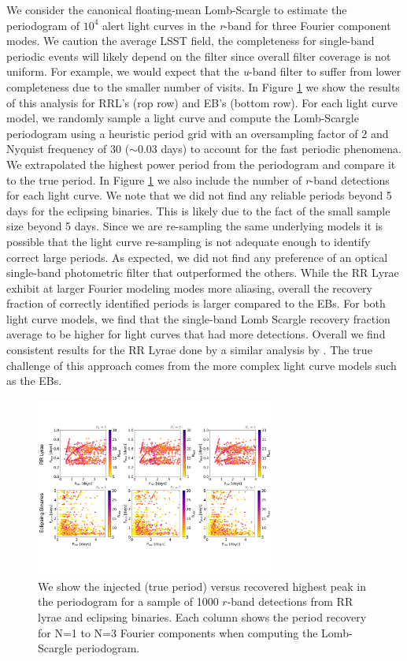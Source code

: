 \documentclass[DM,authoryear,toc]{lsstdoc}
\begin{document}
We consider the canonical floating-mean Lomb-Scargle to estimate the periodogram of $10^4$ alert light curves in the \textit{r}-band for three Fourier component modes. We caution the average LSST field, the completeness for single-band periodic events will likely depend on the filter since overall filter coverage is not uniform. For example, we would expect that the \textit{u}-band filter to suffer from lower completeness due to the smaller number of visits. In Figure \ref{fig:single_band_lsp} we show the results of this analysis for RRL's (rop row) and EB's (bottom row). For each light curve model, we randomly sample a light curve and compute the Lomb-Scargle periodogram using a heuristic period grid with an oversampling factor of 2 and Nyquist frequency of 30 ($\sim$0.03 days) to account for the fast periodic phenomena. We extrapolated the highest power period from the periodogram and compare it to the true period. In Figure \ref{fig:single_band_lsp} we also include the number of \textit{r}-band detections for each light curve. We note that we did not find any reliable periods beyond 5 days for the eclipsing binaries. This is likely due to the fact of the small sample size beyond 5 days. Since we are re-sampling the same underlying models it is possible that the light curve re-sampling is not adequate enough to identify correct large periods. As expected, we did not find any preference of an optical single-band photometric filter that outperformed the others. While the RR Lyrae exhibit at larger Fourier modeling modes more aliasing, overall the recovery fraction of correctly identified periods is larger compared to the EBs. For both light curve models, we find that the single-band Lomb Scargle recovery fraction average to be higher for light curves that had more detections. Overall we find consistent results for the RR Lyrae done by a similar analysis by \citet{VanderPlas:VP2015}. The true challenge of this approach comes from the more complex light curve models such as the EBs.


\begin{figure}
  \includegraphics[width=0.7\textwidth]{figures/singleband_lsp.pdf}
  \centering 
  \caption{We show the injected (true period) versus recovered highest peak in the periodogram for a sample of 1000 $r$-band detections from RR lyrae and eclipsing binaries.
Each column shows the period recovery for N=1 to N=3 Fourier components when computing the Lomb-Scargle periodogram.}
  \label{fig:single_band_lsp}
\end{figure}
\end{document}
